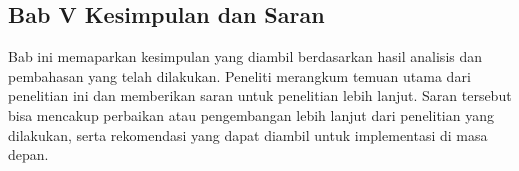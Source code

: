 \subsection{Bab V Kesimpulan dan Saran}
Bab ini memaparkan kesimpulan yang diambil berdasarkan hasil analisis dan pembahasan yang telah dilakukan. Peneliti merangkum temuan utama dari penelitian ini dan memberikan saran untuk penelitian lebih lanjut. Saran tersebut bisa mencakup perbaikan atau pengembangan lebih lanjut dari penelitian yang dilakukan, serta rekomendasi yang dapat diambil untuk implementasi di masa depan.



